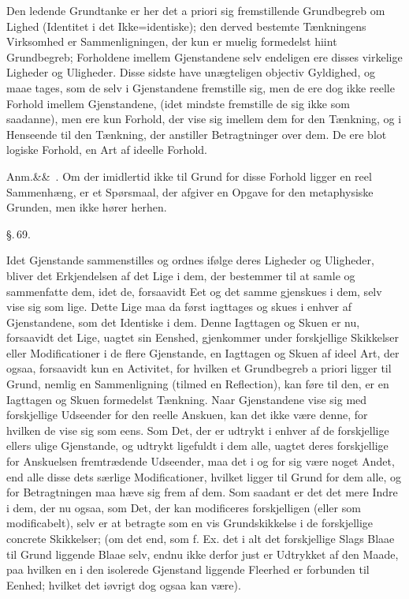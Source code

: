 \documentclass[12pt]{book}
\def\sperr#1{#1}%
\def\textit#1{#1}%
\def\emph#1{#1}%
\newcommand{\sperr}[1]{\textls[180]{#1}}
\newcommand{\parag}[1]{%
  \par\vspace{0.9\baselineskip}%
  {\centering\textit{\S.\,#1.}\par}%
  \vspace{0.35\baselineskip}%
  \noindent\hspace{\parindent}\ignorespaces
}
\newcommand{\anm}[1]{%
  \par\vspace{0.5\baselineskip}%
  \noindent\hspace{\parindent}\sperr{Anm.}\ifx&#1&\else~\textit{#1}.\fi
  \enspace\ignorespaces
}
\newcommand{\opage}[1]{\marginnote{\footnotesize\textit{[#1]}}}
\begin{document}
Den ledende Grundtanke er her det \textit{a priori} sig fremstillende Grundbegreb
\emph{om Lighed} (Identitet i det Ikke=identiske); den derved bestemte Tænkningens
Virksomhed er \emph{Sammenligningen}, der kun er muelig formedelst hiint
Grundbegreb; Forholdene imellem Gjenstandene selv endeligen ere disses virkelige
\emph{Ligheder og Uligheder}. Disse sidste have unægteligen objectiv Gyldighed, og
maae tages, som de selv i Gjenstandene fremstille sig, men de ere dog ikke reelle
Forhold imellem Gjenstandene, (idet mindste fremstille de sig ikke som saadanne),
men ere kun Forhold, der vise sig imellem dem for den Tænkning, og i Henseende til
den Tænkning, der anstiller Betragtninger over dem. De ere blot
\emph{logiske Forhold}, en Art af ideelle Forhold.

\anm{} Om der imidlertid ikke til Grund for disse Forhold ligger en reel
Sammenhæng, er et Spørsmaal, der afgiver en Opgave for den metaphysiske Grunden, men
ikke hører herhen.

\parag{69}
Idet Gjenstande sammenstilles og ordnes ifølge deres Ligheder og Uligheder, bliver
det Erkjendelsen af det Lige i dem, der bestemmer til at samle og sammenfatte dem,
idet de, forsaavidt Eet og det samme gjenskues i dem, selv
\opage{182} vise sig som lige. Dette Lige maa da først iagttages og skues i enhver af
Gjenstandene, som det Identiske i dem. Denne Iagttagen og Skuen er nu, forsaavidt
det Lige, uagtet sin Eenshed, gjenkommer under forskjellige Skikkelser eller
Modificationer i de flere Gjenstande, en Iagttagen og Skuen af ideel Art, der ogsaa,
forsaavidt kun en Activitet, for hvilken et Grundbegreb \textit{a priori} ligger til
Grund, nemlig en Sammenligning (tilmed en Reflection), kan føre til den, er en
Iagttagen og Skuen formedelst Tænkning. Naar Gjenstandene vise sig med forskjellige
Udseender for den reelle Anskuen, kan det ikke være denne, for hvilken de vise sig
som eens. Som Det, der er udtrykt i enhver af de forskjellige ellers ulige
Gjenstande, og udtrykt ligefuldt i dem alle, uagtet deres forskjellige for
Anskuelsen fremtrædende Udseender, maa det i og for sig være noget Andet, end alle
disse dets særlige Modificationer, hvilket ligger til Grund for dem alle, og for
Betragtningen maa hæve sig frem af dem. Som saadant er det det mere Indre i dem, der
nu ogsaa, som Det, der kan modificeres forskjelligen (eller som modificabelt), selv
er at betragte som en vis Grundskikkelse i de forskjellige concrete Skikkelser; (om
det end, som f. Ex. det i alt det forskjellige Slags Blaae til Grund liggende Blaae
selv, endnu ikke derfor just er Udtrykket af den Maade, paa hvilken en i den
isolerede Gjenstand liggende Fleerhed er
\opage{183} forbunden til Eenhed; hvilket det iøvrigt dog ogsaa kan være).
\end{document}
